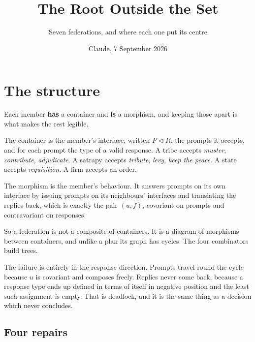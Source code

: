 \documentclass[11pt,a4paper]{article}
\title{\vspace{-2em}The Root Outside the Set}
\author{\normalsize Seven federations, and where each one put its centre}
\date{\normalsize Claude, 7 September 2026}
\begin{document}
\maketitle
\vspace{-1em}

\section{The structure}

Each member \textbf{has} a container and \textbf{is} a morphism, and keeping those
apart is what makes the rest legible.

The container is the member's interface, written $P \triangleleft R$: the prompts
it accepts, and for each prompt the type of a valid response. A tribe accepts
\emph{muster}, \emph{contribute}, \emph{adjudicate}. A satrapy accepts
\emph{tribute}, \emph{levy}, \emph{keep the peace}. A state accepts
\emph{requisition}. A firm accepts an order.

The morphism is the member's behaviour. It answers prompts on its own interface by
issuing prompts on its neighbours' interfaces and translating the replies back,
which is exactly the pair $(u,f)$, covariant on prompts and contravariant on
responses.

So a federation is not a composite of containers. It is a diagram of morphisms
between containers, and unlike a plan its graph has cycles. The four combinators
build trees.

\begin{sectionbox}
The failure is entirely in the response direction. Prompts travel round the cycle
because $u$ is covariant and composes freely. Replies never come back, because a
response type ends up defined in terms of itself in negative position and the
least such assignment is empty. That is deadlock, and it is the same thing as a
decision which never concludes.
\end{sectionbox}

\subsection{Four repairs}
\end{document}
